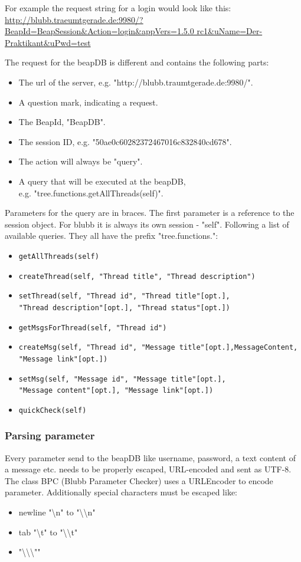 \documentclass[12pt,a4paper,oneside]{report}
\newcommand{\appname}{blubb}
\newcommand{\beapDB}{beapDB}
\newcommand{\code}[1]{\lstinline{#1}}
\begin{document}
For example the request string for a login would look like this:
\url{http://blubb.traeumtgerade.de:9980/?BeapId=BeapSession&Action=login&appVers=1.5.0 rc1&uName=Der-Praktikant&uPwd=test}

The request for the \beapDB{} is different and contains the following parts:
\begin{itemize}

\item The url of the server, e.g. "http://blubb.traumtgerade.de:9980/".
\item A question mark, indicating a request.
\item The BeapId, "BeapDB".
\item The session ID, e.g. "50ae0c60282372467016c832840cd678".
\item The action will always be "query".
\item A query that will be executed at the \beapDB{}, \\
e.g. "tree.functions.getAllThreads(self)".
\end{itemize}

Parameters for the query are in braces. The first parameter is a reference to the session object. For \appname{} it is always its own session - "self". 
Following a list of available queries. They all have the prefix  "tree.functions.":
\begin{itemize}
\item{\code{getAllThreads(self)}}
\item{\code{createThread(self, "Thread title", "Thread description")}}
\item{\code{setThread(self, "Thread id", "Thread title"[opt.],}\\
\code{"Thread description"[opt.], "Thread status"[opt.])}}
\item{\code{getMsgsForThread(self, "Thread id")}}
\item{\code{createMsg(self, "Thread id", "Message title"[opt.],MessageContent, "Message link"[opt.])}}
\item{\code{setMsg(self, "Message id", "Message title"[opt.],}\\
\code{"Message content"[opt.], "Message link"[opt.])}}
\item{\code{quickCheck(self)}}
\end{itemize}


 \subsubsection{Parsing parameter}
Every parameter send to the \beapDB{} like username, password, a text content of a message etc. needs to be properly escaped, URL-encoded and sent as UTF-8.
The class BPC (Blubb Parameter Checker) uses a URLEncoder to encode parameter. 
Additionally special characters must be escaped like:
\begin{itemize}
\item newline "\textbackslash n" to "\textbackslash \textbackslash n"
\item tab "\textbackslash t" to "\textbackslash \textbackslash t"
\item "\textbackslash \textbackslash \textbackslash ""
\end{itemize}
	
\end{document}
